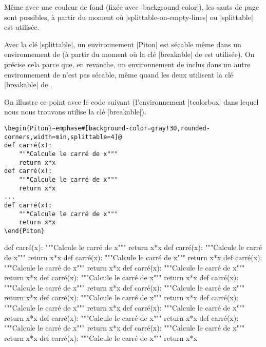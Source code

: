 \documentclass[dvipsnames,svgnames]{article}
\begin{document}
\medskip
\begin{tcolorbox}[breakable]
Même avec une couleur de fond (fixée avec |background-color|), les sauts de page sont
possibles, à partir du moment où |splittable-on-empty-lines| ou |splittable| est
utilisée.

\medskip
Avec la clé |splittable|, un environnement |{Piton}| est sécable même dans un
environnement de  (à partir du moment où la clé |breakable| de
 est utilisée). On précise cela parce que, en revanche, un
environnement de  inclus dans un autre environnement de
 n'est pas sécable, même quand les deux utilisent la clé
|breakable| de .

\medskip
On illustre ce point avec le code suivant (l'environnement |{tcolorbox}| dans lequel nous
nous trouvons utilise la clé |breakable|).

\begin{Verbatim}
\begin{Piton}~emphase#[background-color=gray!30,rounded-corners,width=min,splittable=4]@
def carré(x):
    """Calcule le carré de x"""
    return x*x
def carré(x):
    """Calcule le carré de x"""
    return x*x
...    
def carré(x):
    """Calcule le carré de x"""
    return x*x
\end{Piton}
\end{Verbatim}

\bigskip
\begin{Piton}[background-color=gray!30,rounded-corners,width=min,splittable=4]
def carré(x):
    """Calcule le carré de x"""
    return x*x
def carré(x):
    """Calcule le carré de x"""
    return x*x
def carré(x):
    """Calcule le carré de x"""
    return x*x
def carré(x):
    """Calcule le carré de x"""
    return x*x 
def carré(x):
    """Calcule le carré de x"""
    return x*x
def carré(x):
    """Calcule le carré de x"""
    return x*x
def carré(x):
    """Calcule le carré de x"""
    return x*x
def carré(x):
    """Calcule le carré de x"""
    return x*x
def carré(x):
    """Calcule le carré de x"""
    return x*x
def carré(x):
    """Calcule le carré de x"""
    return x*x
def carré(x):
    """Calcule le carré de x"""
    return x*x
def carré(x):
    """Calcule le carré de x"""
    return x*x
def carré(x):
    """Calcule le carré de x"""
    return x*x
def carré(x):
    """Calcule le carré de x"""
    return x*x
def carré(x):
    """Calcule le carré de x"""
    return x*x
\end{Piton}

\end{tcolorbox}
\end{document}
